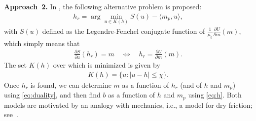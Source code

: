 \documentclass[12pt]{article}
\begin{document}
\bigskip 

\textbf{Approach~2.}
%
In \cite{Prigozhin}, the following alternative problem is proposed:
\begin{align} \label{eq:prigozhin}
    h_r = \arg\min_{u \in K(h)} S(u) - \langle m_p, u\rangle,
\end{align}
with $S(u)$ defined as the Legendre-Fenchel conjugate function of $\frac{1}{\mu_0} \frac{\partial U}{\partial m}(m)$, which simply means that
\begin{align} \label{eq:duality}
    \frac{\partial S}{\partial u}(h_r) = m \quad \Leftrightarrow \quad h_r = \frac{\partial U}{\partial m}(m).
\end{align}
The set $K(h)$ over which is minimized is given by 
\begin{align} \label{eq:Kh}
    K(h) = \{ u : |u-h| \le \chi\}.
\end{align}
%
Once $h_r$ is found, we can determine $m$ as a function of $h_r$ (and of $h$ and $m_p$) using \eqref{eq:duality}, and then find $b$ as a function of $h$
and $m_p$ using \eqref{eq:h}.
%
Both models are motivated by an analogy with mechanics, i.e., a model for dry friction; see~\cite{Moreau}. 



%
\end{document}
